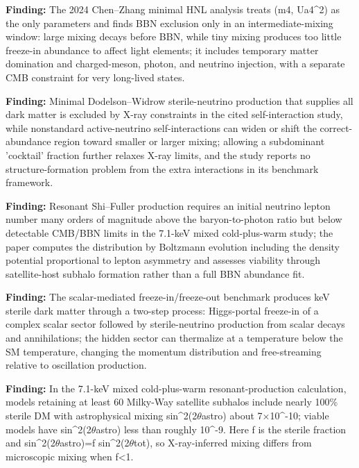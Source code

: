 \documentclass[11pt,a4paper]{article}
\begin{document}
\textbf{Finding:} The 2024 Chen--Zhang minimal HNL analysis treats (m4, \textbar{}Ua4\textbar{}\textasciicircum{}2) as the only parameters and finds BBN exclusion only in an intermediate-mixing window: large mixing decays before BBN, while tiny mixing produces too little freeze-in abundance to affect light elements; it includes temporary matter domination and charged-meson, photon, and neutrino injection, with a separate CMB constraint for very long-lived states.

\textbf{Finding:} Minimal Dodelson--Widrow sterile-neutrino production that supplies all dark matter is excluded by X-ray constraints in the cited self-interaction study, while nonstandard active-neutrino self-interactions can widen or shift the correct-abundance region toward smaller or larger mixing; allowing a subdominant 'cocktail' fraction further relaxes X-ray limits, and the study reports no structure-formation problem from the extra interactions in its benchmark framework.

\textbf{Finding:} Resonant Shi--Fuller production requires an initial neutrino lepton number many orders of magnitude above the baryon-to-photon ratio but below detectable CMB/BBN limits in the 7.1-keV mixed cold-plus-warm study; the paper computes the distribution by Boltzmann evolution including the density potential proportional to lepton asymmetry and assesses viability through satellite-host subhalo formation rather than a full BBN abundance fit.

\textbf{Finding:} The scalar-mediated freeze-in/freeze-out benchmark produces keV sterile dark matter through a two-step process: Higgs-portal freeze-in of a complex scalar sector followed by sterile-neutrino production from scalar decays and annihilations; the hidden sector can thermalize at a temperature below the SM temperature, changing the momentum distribution and free-streaming relative to oscillation production.

\textbf{Finding:} In the 7.1-keV mixed cold-plus-warm resonant-production calculation, models retaining at least 60 Milky-Way satellite subhalos include nearly 100\% sterile DM with astrophysical mixing sin\textasciicircum{}2(2$\theta$astro) about 7$\times$10\textasciicircum{}-10; viable models have sin\textasciicircum{}2(2$\theta$astro) less than roughly 10\textasciicircum{}-9. Here f is the sterile fraction and sin\textasciicircum{}2(2$\theta$astro)=f sin\textasciicircum{}2(2$\theta$tot), so X-ray-inferred mixing differs from microscopic mixing when f\textless{}1.
\end{document}
